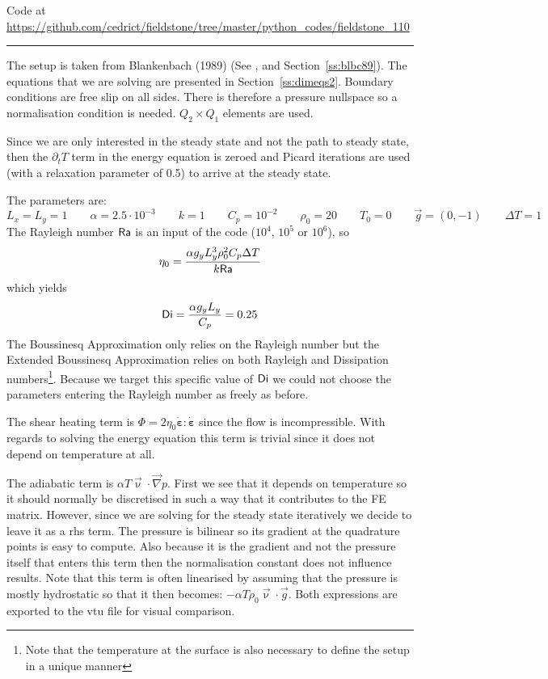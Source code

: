 %

\begin{center}
Code at \url{https://github.com/cedrict/fieldstone/tree/master/python_codes/fieldstone_110}
\end{center}

\par\noindent\rule{\textwidth}{0.4pt}



The setup is taken from Blankenbach \etal (1989) \cite{blbc89} (See , and Section~\ref{ss:blbc89}). 
The equations that we are solving are presented in Section~\ref{ss:dimeqs2}. 
Boundary conditions are free slip on all sides. There is therefore a pressure nullspace
so a normalisation condition is needed.
$Q_2\times Q_1$ elements are used. 

Since we are only interested in the steady state and not the path to steady state, 
then the $\partial_t T$ term in the energy equation is zeroed and Picard iterations
are used (with a relaxation parameter of 0.5) to arrive at the steady state.

The parameters are:
\[
L_x=L_y=1
\qquad
\alpha=2.5\cdot 10^{-3}
\qquad
k=1
\qquad
C_p=10^{-2}
\qquad
\rho_0=20
\qquad
T_0=0
\qquad
\vec{g}=(0,-1)
\qquad
\Delta T = 1
\]
The Rayleigh number ${\mathsf{Ra}}$ is an input of the code ($10^4$, $10^5$ or $10^6$), so 
\[
\eta_0 = \frac{\alpha g_y L_y^3 \rho_0^2 C_p \Delta T}{k {\mathsf{Ra}}}
\]
which yields 
\[
{\mathsf{Di}}=\frac{\alpha g_y L_y}{C_p} = 0.25
\]
The Boussinesq Approximation only relies on the Rayleigh number but the 
Extended Boussinesq Approximation relies on both Rayleigh and Dissipation numbers\footnote{Note that 
the temperature at the surface is also necessary to define the setup in a unique manner}. 
Because we target this specific value of ${\mathsf{Di}}$ we could not choose the 
parameters entering the Rayleigh number as freely as before.

The shear heating term is $\Phi=2 \eta_0 \dot{\bm \varepsilon}:\dot{\bm \varepsilon}$ since the flow
is incompressible. With regards to solving the energy equation this term is trivial since it does not
depend on temperature at all.

The adiabatic term is $\alpha T \vec{\upnu}\cdot\vec\nabla p$. 
First we see that it depends on temperature so it should normally be discretised in such a 
way that it contributes to the FE matrix. However, since we are solving for the steady state
iteratively we decide to leave it as a rhs term.
The pressure is bilinear so its gradient at the quadrature points is easy to compute.  
Also because it is the gradient and not the pressure itself that enters this term then 
the normalisation constant does not influence results.
Note that this term is often linearised by assuming that the pressure is mostly hydrostatic
so that it then becomes: $- \alpha T \rho_0 \vec\upnu\cdot\vec{g}$.
Both expressions are exported to the vtu file for visual comparison.


